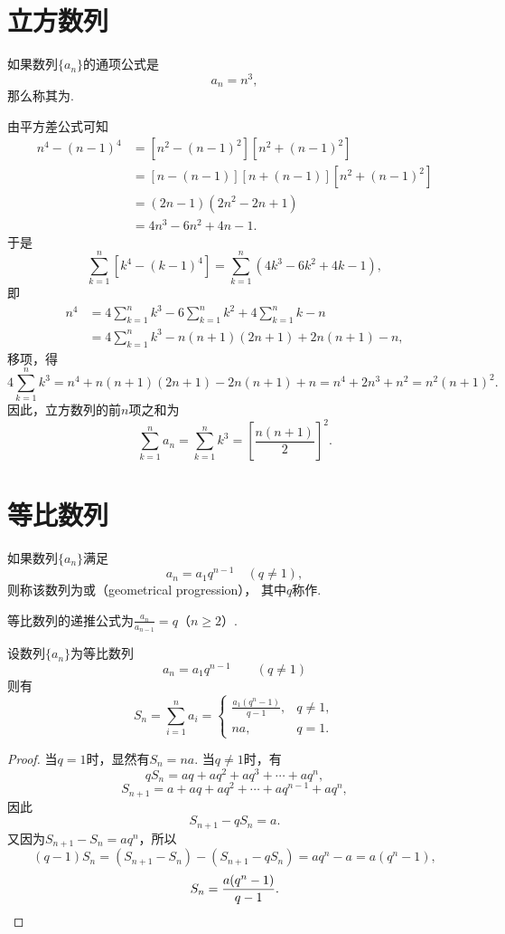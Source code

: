 \section{立方数列}
如果数列\(\{a_n\}\)的通项公式是\[
a_n = n^3,
\]那么称其为.

由平方差公式可知
\[\begin{aligned}
n^4 - (n-1)^4
&= [n^2 - (n-1)^2] [n^2 + (n-1)^2] \\
&= [n - (n-1)] [n + (n-1)] [n^2 + (n-1)^2] \\
&= (2n-1) (2n^2 - 2n + 1) \\
&= 4n^3 - 6n^2 + 4n - 1.
\end{aligned}\]
于是\[
\sum\limits_{k=1}^n [k^4 - (k-1)^4]
= \sum\limits_{k=1}^n (4k^3 - 6k^2 + 4k - 1),
\]即\[\begin{aligned}
n^4
&= 4 \sum\limits_{k=1}^n k^3 - 6 \sum\limits_{k=1}^n k^2 + 4 \sum\limits_{k=1}^n k - n \\
&= 4 \sum\limits_{k=1}^n k^3 - n(n+1)(2n+1) + 2n(n+1) - n,
\end{aligned}\]
移项，得\[
4 \sum\limits_{k=1}^n k^3
= n^4 + n(n+1)(2n+1) - 2n(n+1) + n
= n^4 + 2n^3 + n^2
= n^2(n+1)^2.
\]
因此，立方数列的前\(n\)项之和为
\begin{equation}
\sum\limits_{k=1}^n a_n
= \sum\limits_{k=1}^n k^3
= \left[\frac{n(n+1)}{2}\right]^2.
\end{equation}

\section{等比数列}
\begin{definition}
如果数列\(\{a_n\}\)满足\[
a_n = a_1 q^{n-1} \quad(q\neq1),
\]则称该数列为或（geometrical progression），
其中\(q\)称作.

等比数列的递推公式为\(\frac{a_n}{a_{n-1}} = q\)（\(n \geq 2\)）.
\end{definition}

\begin{property}[等比数列求和]
设数列\(\{a_n\}\)为等比数列\[
a_n = a_1 q^{n-1} \qquad (q \neq 1)
\]则有\[
S_n = \sum\limits_{i=1}^n a_i
= \left\{ \begin{array}{cl}
\frac{a_1 (q^n-1)}{q-1}, & q \neq 1, \\
na, & q = 1.
\end{array} \right.
\]
\begin{proof}
当\(q = 1\)时，显然有\(S_n = na\).
当\(q \neq 1\)时，有\[
q S_n = aq+aq^2+aq^3+\dotsb+aq^n,
\]\[
S_{n+1} = a+aq+aq^2+\dotsb+aq^{n-1}+aq^n,
\]因此\[
S_{n+1} - q S_n = a.
\]又因为\(S_{n+1} - S_n = aq^n\)，所以\[
(q-1) S_n = (S_{n+1} - S_n) - (S_{n+1} - q S_n) = aq^n - a = a(q^n - 1),
\]\[
S_n = \frac{a(q^n - 1)}{q-1}.
\qedhere
\]
\end{proof}
\end{property}

